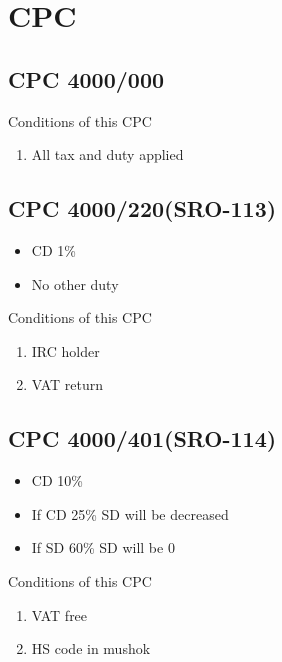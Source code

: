 \documentclass[10pt]{article}
\begin{document}
\section{CPC}\label{CPC}

\subsection{CPC 4000/000}
\begin{description}
    \item [Conditions of this CPC]
\end{description}
\begin{enumerate}
    \item All tax and duty applied
\end{enumerate}

\subsection{CPC 4000/220(SRO-113)}
\begin{itemize}
        \item CD 1\%
        \item No other duty
\end{itemize}
\begin{description}
    \item [Conditions of this CPC]
\end{description}
\begin{enumerate}
        \item IRC holder
        \item VAT return
\end{enumerate}

\subsection{CPC 4000/401(SRO-114)}
\begin{itemize}
        \item CD 10\%
        \item If CD 25\% SD will be decreased
        \item If SD 60\% SD will be 0%
\end{itemize}
\begin{description}
    \item [Conditions of this CPC]
\end{description}
\begin{enumerate}
        \item VAT free
        \item HS code in mushok
\end{enumerate}
\end{document}
